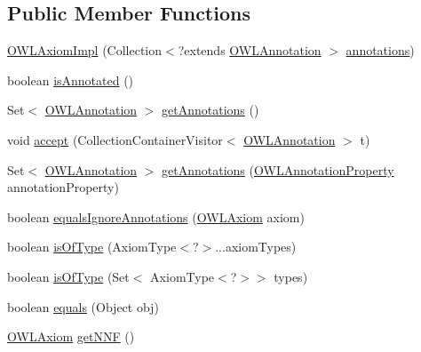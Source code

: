 \subsection*{Public Member Functions}
\begin{DoxyCompactItemize}
\item 
\hyperlink{classuk_1_1ac_1_1manchester_1_1cs_1_1owl_1_1owlapi_1_1_o_w_l_axiom_impl_aa1e13d48e198af022c450fd96881a5b9}{O\-W\-L\-Axiom\-Impl} (Collection$<$?extends \hyperlink{interfaceorg_1_1semanticweb_1_1owlapi_1_1model_1_1_o_w_l_annotation}{O\-W\-L\-Annotation} $>$ \hyperlink{classuk_1_1ac_1_1manchester_1_1cs_1_1owl_1_1owlapi_1_1_o_w_l_axiom_impl_af6fbf6188f7bdcdc6bef5766feed695e}{annotations})
\item 
boolean \hyperlink{classuk_1_1ac_1_1manchester_1_1cs_1_1owl_1_1owlapi_1_1_o_w_l_axiom_impl_af3786b48f0b6555f030a4836626f90fc}{is\-Annotated} ()
\item 
Set$<$ \hyperlink{interfaceorg_1_1semanticweb_1_1owlapi_1_1model_1_1_o_w_l_annotation}{O\-W\-L\-Annotation} $>$ \hyperlink{classuk_1_1ac_1_1manchester_1_1cs_1_1owl_1_1owlapi_1_1_o_w_l_axiom_impl_a88556638e50b24de648c385494821495}{get\-Annotations} ()
\item 
void \hyperlink{classuk_1_1ac_1_1manchester_1_1cs_1_1owl_1_1owlapi_1_1_o_w_l_axiom_impl_a5554edc5e23275375283570b0dbd2fed}{accept} (Collection\-Container\-Visitor$<$ \hyperlink{interfaceorg_1_1semanticweb_1_1owlapi_1_1model_1_1_o_w_l_annotation}{O\-W\-L\-Annotation} $>$ t)
\item 
Set$<$ \hyperlink{interfaceorg_1_1semanticweb_1_1owlapi_1_1model_1_1_o_w_l_annotation}{O\-W\-L\-Annotation} $>$ \hyperlink{classuk_1_1ac_1_1manchester_1_1cs_1_1owl_1_1owlapi_1_1_o_w_l_axiom_impl_a8bd15d3508e151a944532f81d5db3859}{get\-Annotations} (\hyperlink{interfaceorg_1_1semanticweb_1_1owlapi_1_1model_1_1_o_w_l_annotation_property}{O\-W\-L\-Annotation\-Property} annotation\-Property)
\item 
boolean \hyperlink{classuk_1_1ac_1_1manchester_1_1cs_1_1owl_1_1owlapi_1_1_o_w_l_axiom_impl_ab94013524fbc6750ca4e8eb162746ae7}{equals\-Ignore\-Annotations} (\hyperlink{interfaceorg_1_1semanticweb_1_1owlapi_1_1model_1_1_o_w_l_axiom}{O\-W\-L\-Axiom} axiom)
\item 
boolean \hyperlink{classuk_1_1ac_1_1manchester_1_1cs_1_1owl_1_1owlapi_1_1_o_w_l_axiom_impl_a9f02d0e446e8a48dae4d814761daf1d6}{is\-Of\-Type} (Axiom\-Type$<$?$>$...axiom\-Types)
\item 
boolean \hyperlink{classuk_1_1ac_1_1manchester_1_1cs_1_1owl_1_1owlapi_1_1_o_w_l_axiom_impl_a52b293d80981a09b778388713cc5094a}{is\-Of\-Type} (Set$<$ Axiom\-Type$<$?$>$$>$ types)
\item 
boolean \hyperlink{classuk_1_1ac_1_1manchester_1_1cs_1_1owl_1_1owlapi_1_1_o_w_l_axiom_impl_a99246b5e8dc8d030ebb03a19a39fdd9e}{equals} (Object obj)
\item 
\hyperlink{interfaceorg_1_1semanticweb_1_1owlapi_1_1model_1_1_o_w_l_axiom}{O\-W\-L\-Axiom} \hyperlink{classuk_1_1ac_1_1manchester_1_1cs_1_1owl_1_1owlapi_1_1_o_w_l_axiom_impl_a9fb2d91197ed3051dd1bfcf37f1d5bdc}{get\-N\-N\-F} ()
\end{DoxyCompactItemize}

